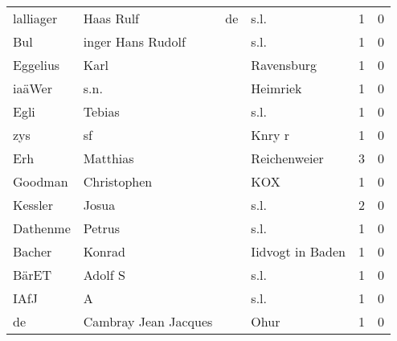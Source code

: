 \begin{tabular}{llllrr}
                lalliager &                          Haas Rulf &          de &                                        s.l. &          1 &         0 \\
                      Bul &                  inger Hans Rudolf &             &                                        s.l. &          1 &         0 \\
                 Eggelius &                               Karl &             &                                  Ravensburg &          1 &         0 \\
                   iaäWer &                               s.n. &             &                                    Heimriek &          1 &         0 \\
                     Egli &                             Tebias &             &                                        s.l. &          1 &         0 \\
                      zys &                                 sf &             &                                      Knry r &          1 &         0 \\
                      Erh &                           Matthias &             &                                Reichenweier &          3 &         0 \\
                  Goodman &                        Christophen &             &                                         KOX &          1 &         0 \\
                  Kessler &                              Josua &             &                                        s.l. &          2 &         0 \\
                 Dathenme &                             Petrus &             &                                        s.l. &          1 &         0 \\
                   Bacher &                             Konrad &             &                            Iidvogt in Baden &          1 &         0 \\
                    BärET &                            Adolf S &             &                                        s.l. &          1 &         0 \\
                     IAfJ &                                  A &             &                                        s.l. &          1 &         0 \\
                       de &               Cambray Jean Jacques &             &                                        Ohur &          1 &         0 \\

\end{tabular}
